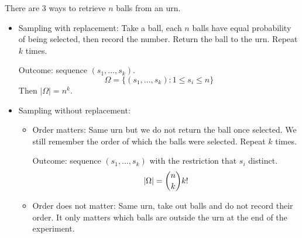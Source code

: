 \documentclass{report}
\begin{document}
\begin{examples}
    \begin{example}
        There are $3$ ways to retrieve $n$ balls from an urn.
            \begin{itemize}
                \item Sampling with replacement: Take a ball, each $n$ balls have equal probability of being selected, then record the number. Return the ball to the urn. Repeat $k$ times. 

                Outcome: sequence $(s_{1}, \ldots, s_{k})$. 
                    \begin{equation*}
                        \Omega = \{(s_{1}, \ldots, s_{k}): 1 \leq s_{i} \leq n\}
                    \end{equation*}
                Then $\lvert \Omega \rvert = n^{k}$. 

                \item Sampling without replacement:
                    \begin{itemize}
                        \item Order matters: Same urn but we do not return the ball once selected. We still remember the order of which the balls were selected. Repeat $k$ times.

                        Outcome: sequence $(s_{1}, \ldots, s_{k})$ with the restriction that $s_{i}$ distinct. 
                            \begin{equation*}
                                \lvert \Omega \rvert = \dbinom{n}{k}k!
                            \end{equation*}

                        \item Order does not matter: Same urn, take out balls and do not record their order. It only matters which balls are outside the urn at the end of the experiment.


\end{itemize}
\end{itemize}
\end{example}
\end{examples}
\end{document}
